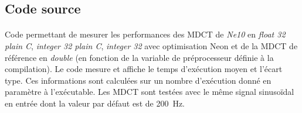 \documentclass{article}
\begin{document}
\subsection{Code source}\label{app:perf_mdct_ne10_code}
\paragraph{}
Code permettant de mesurer les performances des MDCT de \emph{Ne10} en \emph{float 32 plain C}, \emph{integer 32 plain C}, \emph{integer 32} avec optimisation Neon et de la MDCT de référence en \emph{double} (en fonction de la variable de préprocesseur définie à la compilation). Le code mesure et affiche le temps d'exécution moyen et l'écart type. Ces informations sont calculées sur un nombre d'exécution donné en paramètre à l'exécutable. Les MDCT sont testées avec le même signal sinusoïdal en entrée dont la valeur par défaut est de \SI{200}{\hertz}.
\lstset{language=C++}
\end{document}
